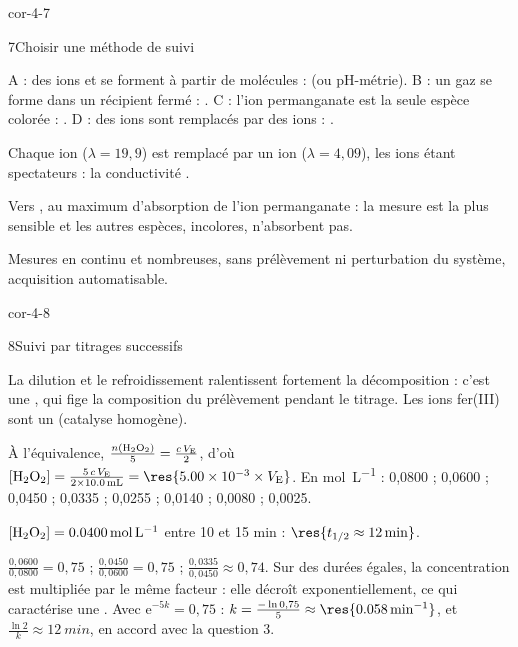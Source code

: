 \begin{blocLivre}{cor-4-7}
\begin{corrige}{7}{Choisir une méthode de suivi}
\begin{questions}
\item A : des ions  et  se forment à partir de molécules :  (ou pH-métrie).
B : un gaz se forme dans un récipient fermé : .
C : l'ion permanganate est la seule espèce colorée : .
D : des ions  sont remplacés par des ions  : .
\item Chaque ion  ($\lambda=19{,}9$) est remplacé par un ion  ($\lambda=4{,}09$), les ions 
étant spectateurs : la conductivité .
\item Vers , au maximum d'absorption de l'ion permanganate : la mesure est la plus sensible et les
autres espèces, incolores, n'absorbent pas.
\item Mesures en continu et nombreuses, sans prélèvement ni perturbation du système, acquisition automatisable.
\end{questions}
\end{corrige}
\end{blocLivre}
\begin{blocLivre}{cor-4-8}
\begin{corrige}{8}{Suivi par titrages successifs}
\begin{questions}
\item La dilution et le refroidissement ralentissent fortement la décomposition : c'est une , qui fige
la composition du prélèvement pendant le titrage. Les ions fer(III) sont un  (catalyse homogène).
\item À l'équivalence, $\frac{n(\ce{H2O2})}{5}=\frac{c\,V_\mathrm{E}}{2}$, d'où
$[\ce{H2O2}]=\frac{5\,c\,V_\mathrm{E}}{2\times\qty{10,0}{mL}}=\res{\num{5.00e-3}\times V_\mathrm{E}}$. En
\unit{mol.L^{-1}} : 0,0800 ; 0,0600 ; 0,0450 ; 0,0335 ; 0,0255 ; 0,0140 ; 0,0080 ; 0,0025.
\item $[\ce{H2O2}]=\qty{0,0400}{mol.L^{-1}}$ entre 10 et 15 min : $\res{t_{1/2}\approx\qty{12}{min}}$.
\item $\frac{0{,}0600}{0{,}0800}=0{,}75$ ; $\frac{0{,}0450}{0{,}0600}=0{,}75$ ; $\frac{0{,}0335}{0{,}0450}\approx0{,}74$.
Sur des durées égales, la concentration est multipliée par le même facteur : elle décroît exponentiellement, ce qui
caractérise une . Avec $\mathrm{e}^{-5k}=0{,}75$ :
$k=\frac{-\ln0{,}75}{5}\approx\res{\qty{0,058}{min^{-1}}}$, et $\frac{\ln2}{k}\approx\qty{12}{min}$, en accord avec la question 3.
\end{questions}
\end{corrige}
\end{blocLivre}
